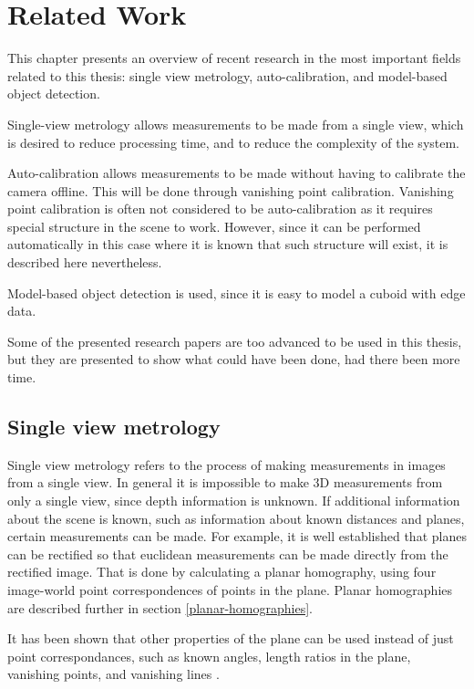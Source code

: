 \chapter{Related Work}
This chapter presents an overview of recent research in the most important fields related to this thesis: single view metrology, auto-calibration, and model-based object detection.

Single-view metrology allows measurements to be made from a single view, which is desired to reduce processing time, and to reduce the complexity of the system.

Auto-calibration allows measurements to be made without having to calibrate the camera offline.
This will be done through vanishing point calibration.
Vanishing point calibration is often not considered to be auto-calibration as it requires special structure in the scene to work. 
However, since it can be performed automatically in this case where it is known that such structure will exist, it is described here nevertheless.

Model-based object detection is used, since it is easy to model a cuboid with edge data.

Some of the presented research papers are too advanced to be used in this thesis, but they are presented to show what could have been done, had there been more time.

\section{Single view metrology}
Single view metrology refers to the process of making measurements in images from a single view.
In general it is impossible to make 3D measurements from only a single view, since depth information is unknown.
If additional information about the scene is known, such as information about known distances and planes, certain measurements can be made.
For example, it is well established that planes can be rectified so that euclidean measurements can be made directly from the rectified image.
That is done by calculating a planar homography, using four image-world point correspondences of points in the plane.
Planar homographies are described further in section \ref{planar-homographies}.

It has been shown that other properties of the plane can be used instead of just point correspondances, such as known angles, length ratios in the plane, vanishing points, and vanishing lines \cite{liebowitz1998metric} \cite{criminisi2000single}.

